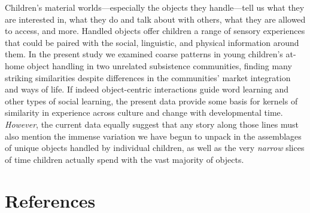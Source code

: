 \documentclass[10pt, letterpaper]{article}
\begin{document}
Children's material worlds---especially the objects they handle---tell
us what they are interested in, what they do and talk about with others,
what they are allowed to access, and more. Handled objects offer
children a range of sensory experiences that could be paired with the
social, linguistic, and physical information around them. In the present
study we examined coarse patterns in young children's at-home object
handling in two unrelated subsistence communities, finding many striking
similarities despite differences in the communities' market integration
and ways of life. If indeed object-centric interactions guide word
learning and other types of social learning, the present data provide
some basis for kernels of similarity in experience across culture and
change with developmental time. \emph{However}, the current data equally
suggest that any story along those lines must also mention the immense
variation we have begun to unpack in the assemblages of unique objects
handled by individual children, as well as the very \emph{narrow} slices
of time children actually spend with the vast majority of objects.

\hypertarget{references}{%
\section{References}\label{references}}

\setlength{\parindent}{-0.1in} 
\setlength{\leftskip}{0.125in}

\noindent
\end{document}
